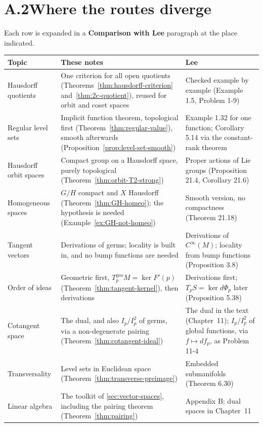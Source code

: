 \documentclass[11pt]{report}
\newcommand{\geo}{\mathrm{geo}}
\begin{document}
\section*{A.2\quad Where the routes diverge}

Each row is expanded in a \textbf{Comparison with Lee} paragraph at the place indicated.

\begin{longtable}{>{\raggedright\arraybackslash}p{3.2cm} >{\raggedright\arraybackslash}p{5.9cm} >{\raggedright\arraybackslash}p{5.7cm}}
\toprule
\textbf{Topic} & \textbf{These notes} & \textbf{Lee} \\ \midrule \endhead
Hausdorff quotients & One criterion for all open quotients (Theorems~\ref{thm:hausdorff-criterion} and~\ref{thm:2c-quotient}), reused for orbit and coset spaces & Checked example by example (Example 1.5, Problem 1-9) \\
Regular level sets & Implicit function theorem, topological first (Theorem~\ref{thm:regular-value}), smooth afterwards (Proposition~\ref{prop:level-set-smooth}) & Example 1.32 for one function; Corollary 5.14 via the constant-rank theorem \\
Hausdorff orbit spaces & Compact group on a Hausdorff space, purely topological (Theorem~\ref{thm:orbit-T2-strong}) & Proper actions of Lie groups (Proposition 21.4, Corollary 21.6) \\
Homogeneous spaces & $G/H$ compact and $X$ Hausdorff (Theorem~\ref{thm:GH-homeo}); the hypothesis is needed (Example~\ref{ex:GH-not-homeo}) & Smooth version, no compactness (Theorem 21.18) \\
Tangent vectors & Derivations of germs; locality is built in, and no bump functions are needed & Derivations of $C^\infty(M)$; locality from bump functions (Proposition 3.8) \\
Order of ideas & Geometric first, $T^{\geo}_pM = \ker F'(p)$ (Theorem~\ref{thm:tangent-kernel}), then derivations & Derivations first; $T_pS = \ker d\Phi_p$ later (Proposition 5.38) \\
Cotangent space & The dual, and also $I_p/I_p^2$ of germs, via a non-degenerate pairing (Theorem~\ref{thm:cotangent-ideal}) & The dual in the text (Chapter~11); $I_p/I_p^2$ of global functions, via $f \mapsto df_p$, as Problem 11-4 \\
Transversality & Level sets in Euclidean space (Theorem~\ref{thm:transverse-preimage}) & Embedded submanifolds (Theorem 6.30) \\
Linear algebra & The toolkit of \ref{sec:vector-spaces}, including the pairing theorem (Theorem~\ref{thm:pairing}) & Appendix B; dual spaces in Chapter~11 \\
\bottomrule
\end{longtable}
\end{document}
